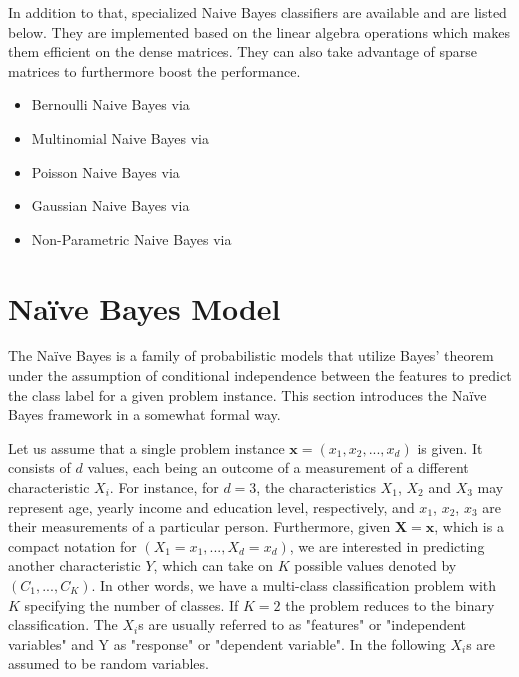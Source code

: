\documentclass{article}\usepackage[]{graphicx}\usepackage[]{color}
\begin{document}
\vspace{2mm}
In addition to that, specialized Naive Bayes classifiers are available and are listed below. They are implemented based on the linear algebra operations which makes them efficient on the dense matrices. They can also take advantage of sparse matrices to furthermore boost the performance.

\begin{itemize}
 \item Bernoulli Naive Bayes via \textcolor{darkgreen}{{}}
 \item Multinomial Naive Bayes via \textcolor{darkgreen}{{}}
 \item Poisson Naive Bayes via \textcolor{darkgreen}{{}}
 \item Gaussian Naive Bayes via \textcolor{darkgreen}{{}}
 \item Non-Parametric Naive Bayes via \textcolor{darkgreen}{{}}
\end{itemize}


\section{Na\"ive Bayes Model}

The Na\"ive Bayes is a family of probabilistic models that utilize Bayes' theorem under the assumption of conditional independence between the features to predict the class label for a given problem instance. This section introduces the Na\"ive Bayes framework in a somewhat formal way.

Let us assume that a single problem instance $\boldsymbol{x} = (x_1, x_2, ..., x_d)$ is given. It consists of $d$ values, each being an outcome of a measurement of a different characteristic $X_i$. For instance, for $d=3$, the characteristics $X_1$, $X_2$ and $X_3$ may represent age, yearly income and education level, respectively, and $x_1$, $x_2$, $x_3$ are their measurements of a particular person. Furthermore, given $\boldsymbol{X} = \boldsymbol{x}$, which is a compact notation for $(X_1 = x_1,...,X_d = x_d)$, we are interested in predicting another characteristic $Y$, which can take on $K$ possible values denoted by $(C_1,...,C_K)$. In other words, we have a multi-class classification problem with $K$ specifying the number of classes. If $K=2$ the problem reduces to the binary classification. The $X_i$s are usually referred to as "features" or "independent variables" and Y as "response" or "dependent variable". In the following $X_i$s are assumed to be random variables.
\end{document}
